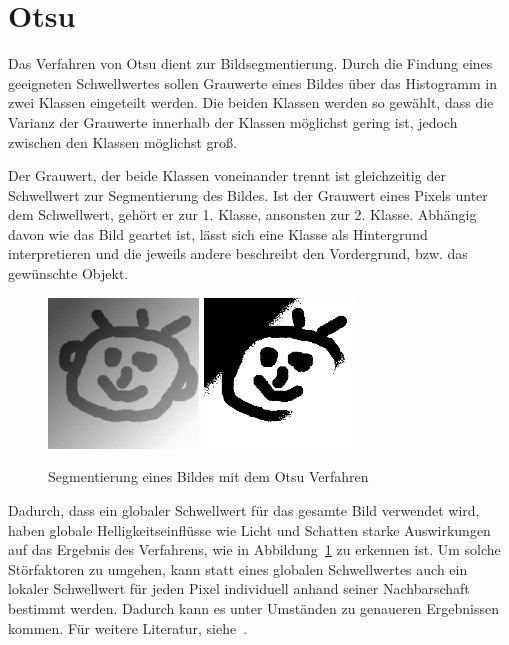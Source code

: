 
\section{Otsu} %
Das Verfahren von Otsu dient zur Bildsegmentierung.
Durch die Findung eines geeigneten Schwellwertes sollen Grauwerte eines Bildes über das Histogramm in zwei Klassen eingeteilt werden.
Die beiden Klassen werden so gewählt, dass die Varianz der Grauwerte innerhalb der Klassen möglichst gering ist, jedoch zwischen den Klassen möglichst groß.

Der Grauwert, der beide Klassen voneinander trennt ist gleichzeitig der Schwellwert zur Segmentierung des Bildes. Ist der Grauwert eines Pixels unter dem Schwellwert, gehört er zur 1. Klasse, ansonsten zur 2. Klasse.
Abhängig davon wie das Bild geartet ist, lässt sich eine Klasse als Hintergrund interpretieren und die jeweils andere beschreibt den Vordergrund, bzw. das gewünschte Objekt.

\begin{figure}[ht]
   \centering
     \includegraphics[width=4cm]{Bilder/otsu-1}
     \includegraphics[width=4cm]{Bilder/otsu-2} \\
 \caption{Segmentierung eines Bildes mit dem Otsu Verfahren}
 \label{fig:Otsu}
\end{figure}

Dadurch, dass ein globaler Schwellwert für das gesamte Bild verwendet wird, haben globale Helligkeitseinflüsse wie Licht und Schatten starke Auswirkungen auf das Ergebnis des Verfahrens, wie in Abbildung~\ref{fig:Otsu} zu erkennen ist. Um solche Störfaktoren zu umgehen, kann statt eines globalen Schwellwertes auch ein lokaler Schwellwert für jeden Pixel individuell anhand seiner Nachbarschaft bestimmt werden. Dadurch kann es unter Umständen zu genaueren Ergebnissen kommen.
Für weitere Literatur, siehe~\cite{Otsu}.

